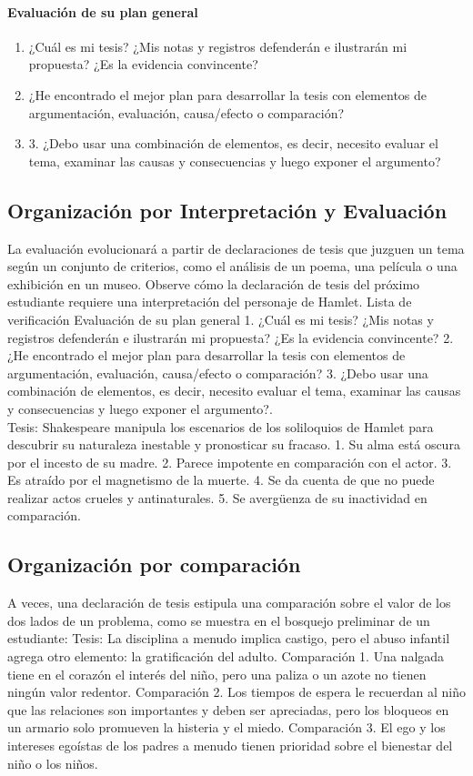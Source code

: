 \paragraph{Evaluación de su plan general }
\begin{enumerate}[1.]
    \item ¿Cuál es mi tesis? ¿Mis notas y registros defenderán e ilustrarán mi propuesta? ¿Es la evidencia convincente? 
    \item ¿He encontrado el mejor plan para desarrollar la tesis con elementos de argumentación, evaluación, causa/efecto o comparación? 
    \item 3. ¿Debo usar una combinación de elementos, es decir, necesito evaluar el tema, examinar las causas y consecuencias y luego exponer el argumento?
\end{enumerate}


\subsection{Organización por Interpretación y Evaluación}
La evaluación evolucionará a partir de declaraciones de tesis que juzguen un tema según un conjunto de criterios, como el análisis de un poema, una película o una exhibición en un museo. Observe cómo la declaración de tesis del próximo estudiante requiere una interpretación del personaje de Hamlet.
Lista de verificación Evaluación de su plan general 1. ¿Cuál es mi tesis? ¿Mis notas y registros defenderán e ilustrarán mi propuesta? ¿Es la evidencia convincente? 2. ¿He encontrado el mejor plan para desarrollar la tesis con elementos de argumentación, evaluación, causa/efecto o comparación? 3. ¿Debo usar una combinación de elementos, es decir, necesito evaluar el tema, examinar las causas y consecuencias y luego exponer el argumento?.\\

Tesis: Shakespeare manipula los escenarios de los soliloquios de Hamlet para descubrir su naturaleza inestable y pronosticar su fracaso. 1. Su alma está oscura por el incesto de su madre. 2. Parece impotente en comparación con el actor. 3. Es atraído por el magnetismo de la muerte. 4. Se da cuenta de que no puede realizar actos crueles y antinaturales. 5. Se avergüenza de su inactividad en comparación.

\subsection{Organización por comparación}
A veces, una declaración de tesis estipula una comparación sobre el valor de los dos lados de un problema, como se muestra en el bosquejo preliminar de un estudiante: Tesis: La disciplina a menudo implica castigo, pero el abuso infantil agrega otro elemento: la gratificación del adulto. Comparación 1. Una nalgada tiene en el corazón el interés del niño, pero una paliza o un azote no tienen ningún valor redentor. Comparación 2. Los tiempos de espera le recuerdan al niño que las relaciones son importantes y deben ser apreciadas, pero los bloqueos en un armario solo promueven la histeria y el miedo. Comparación 3. El ego y los intereses egoístas de los padres a menudo tienen prioridad sobre el bienestar del niño o los niños.

